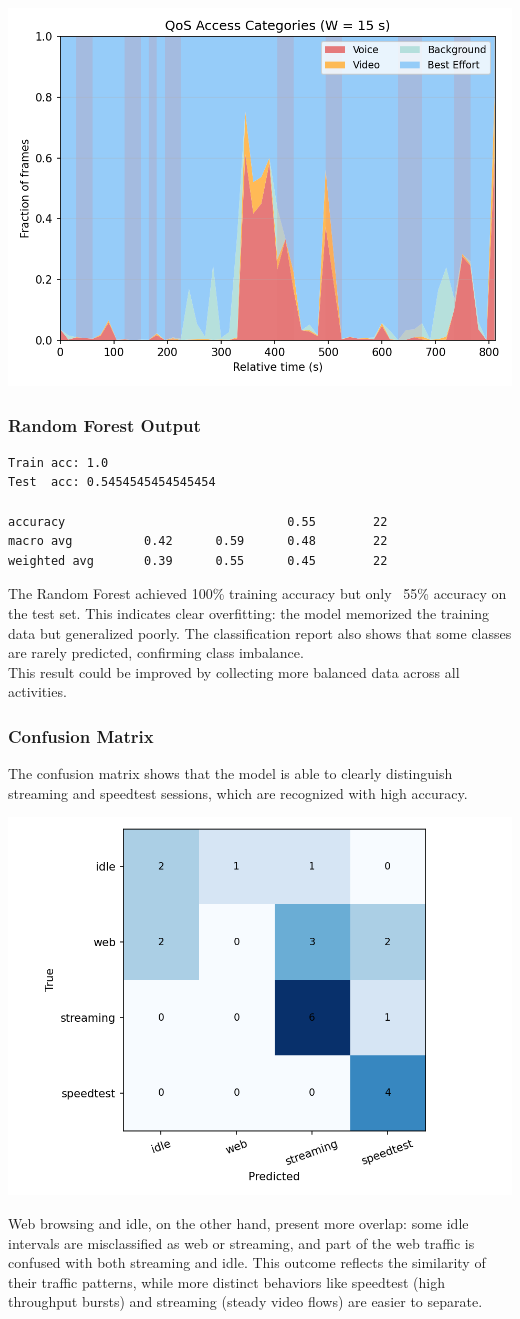 \documentclass[a4paper,10pt]{article}
\begin{document}
\begin{center}
    \includegraphics[width=.4\textwidth]{img/plot_qos_composition_W15.png}
\end{center}

\subsubsection*{Random Forest Output}
\begin{lstlisting}
Train acc: 1.0
Test  acc: 0.5454545454545454

accuracy                               0.55        22
macro avg          0.42      0.59      0.48        22
weighted avg       0.39      0.55      0.45        22
\end{lstlisting}

The Random Forest achieved 100\% training accuracy but only ~55\% accuracy on the test set. This indicates clear overfitting: the model memorized the training data but generalized poorly. The classification report also shows that some classes are rarely predicted, confirming class imbalance.\\
This result could be improved by collecting more balanced data across all activities.

\subsubsection*{Confusion Matrix}
The confusion matrix shows that the model is able to clearly distinguish streaming and speedtest sessions, which are recognized with high accuracy. 

\begin{center}
    \includegraphics[width=.4\textwidth]{img/confusion_matrix_W15.png}
\end{center}

Web browsing and idle, on the other hand, present more overlap: some idle intervals are misclassified as web or streaming, and part of the web traffic is confused with both streaming and idle.
This outcome reflects the similarity of their traffic patterns, while more distinct behaviors like speedtest (high throughput bursts) and streaming (steady video flows) are easier to separate.
\end{document}
